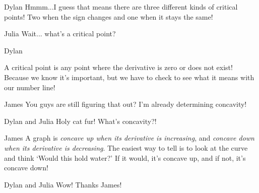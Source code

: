 \documentclass{ximera}
\begin{document}
\begin{dialogue}
\item[Dylan] Hmmm...I guess that means there are three different kinds of critical points! Two when the sign changes and one when it stays the same!
\item[Julia] Wait... what's a critical point?
\item[Dylan] \begin{definition} A critical point is any point where the derivative is zero or does not exist! Because we know it's important, but we have to check to see what it means with our number line!
\end{definition}
\item[James] You guys are still figuring that out? I'm already determining concavity!
\item[Dylan and Julia] Holy cat fur! What's concavity?!
\item[James] A graph is \textit{concave up when its derivative is increasing}, and \textit{concave down when its derivative is decreasing}. The easiest way to tell is to look at the curve and think `Would this hold water?' If it would, it's concave up, and if not, it's concave down!
\item[Dylan and Julia] Wow! Thanks James!
\end{dialogue}
\end{document}
